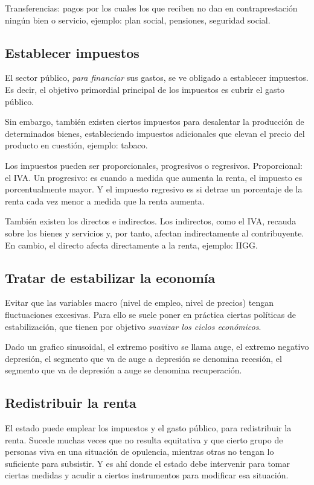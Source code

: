 Transferencias: 
pagos por los cuales los que reciben no dan en contraprestación ningún bien o servicio,
ejemplo: 
plan social, pensiones, seguridad social.

\subsection{Establecer impuestos}

El sector público, 
\textit{para financiar} sus gastos, 
se ve obligado a establecer impuestos.
Es decir, 
el objetivo primordial principal de los impuestos es cubrir el gasto público.

Sin embargo, 
también existen ciertos impuestos para desalentar la producción de determinados bienes,
estableciendo impuestos adicionales que elevan el precio del producto en cuestión,
ejemplo: tabaco.

Los impuestos pueden ser proporcionales, progresivos o regresivos.
Proporcional: el IVA. 
Un progresivo: es cuando a medida que aumenta la renta,
el impuesto es porcentualmente mayor. 
Y el impuesto regresivo es si detrae un porcentaje de la renta cada vez menor a medida que la renta aumenta.

También existen los directos e indirectos.
Los indirectos,
como el IVA, 
recauda sobre los bienes y servicios y, 
por tanto,
afectan indirectamente al contribuyente.
En cambio, 
el directo afecta directamente a la renta, 
ejemplo: IIGG.

\subsection{Tratar de estabilizar la economía}

Evitar que las variables macro 
(nivel de empleo, nivel de precios) 
tengan fluctuaciones excesivas.
Para ello se suele poner en práctica ciertas políticas de estabilización,
que tienen por objetivo \textit{suavizar los ciclos económicos}.

Dado un grafico sinusoidal,
el extremo positivo se llama auge,
el extremo negativo depresión,
el segmento que va de auge a depresión se denomina recesión,
el segmento que va de depresión a auge se denomina recuperación.

\subsection{Redistribuir la renta}

El estado puede emplear los impuestos y el gasto público, 
para redistribuir la renta.
Sucede muchas veces que no resulta equitativa y que cierto grupo de personas
viva en una situación de opulencia, 
mientras otras no tengan lo suficiente para subsistir.
Y es ahí donde el estado debe intervenir para tomar ciertas medidas 
y acudir a ciertos instrumentos para modificar esa situación.

